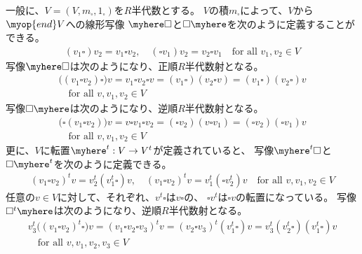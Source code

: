 	一般に、$V=(V,m_\square,1_\square)$を$R$半代数とする。
	$V$の積$m_\square$によって、$V$から$\myop{end}V$への線形写像
	$\myhere\square$と$\square\myhere$を次のように定義することができる。
	\begin{equation*}\begin{split} %
		(v_1\square)v_2 = v_1\square v_2
		,\quad (\square v_1)v_2 = v_2\square v_1
		\quad\text{for all }v_1,v_2\in V
	\end{split}\end{equation*} %
	写像$\myhere\square$は次のようになり、正順$R$半代数射となる。
	\begin{equation*}\begin{split} %
		\bigl((v_1\square v_2)\square\bigr)v = v_1\square v_2\square v
		= (v_1\square)(v_2\square v)
		= (v_1\square)(v_2\square)v \\
		\quad\text{for all }v,v_1,v_2\in V
	\end{split}\end{equation*} %
	写像$\square\myhere$は次のようになり、逆順$R$半代数射となる。
	\begin{equation*}\begin{split} %
		\bigl(\square(v_1\square v_2)\bigr)v = v\square v_1\square v_2
		= (\square v_2)(v\square v_1)
		= (\square v_2)(\square v_1)v \\
		\quad\text{for all }v,v_1,v_2\in V
	\end{split}\end{equation*} %
	更に、$V$に転置$\myhere^t:V\to V^t$が定義されていると、
	写像$\myhere^t\square$と$\square\myhere^t$を次のように定義できる。
	\begin{equation*}\begin{split} %
		(v_1\square v_2)^t v = v_2^t(v_1^t\square)v
		,\quad (v_1\square v_2)^t v = v_1^t(\square v_2^t)v
		\quad\text{for all }v,v_1,v_2\in V
	\end{split}\end{equation*} %
	任意の$v\in V$に対して、それぞれ、$v^t\square$は$v\square$の、
	$\square v^t$は$\square v$の転置になっている。
	写像$\square^t\myhere$は次のようになり、逆順$R$半代数射となる。
	\begin{equation*}\begin{split} %
		v_3^t\bigl((v_1\square v_2)^t\square\bigr)v
		= (v_1\square v_2\square v_3)^t v 
		= (v_2\square v_3)^t (v_1^t\square) v 
		= v_3^t (v_2^t\square)(v_1^t\square) v \\
		\quad\text{for all }v,v_1,v_2,v_3\in V
	\end{split}\end{equation*} %
